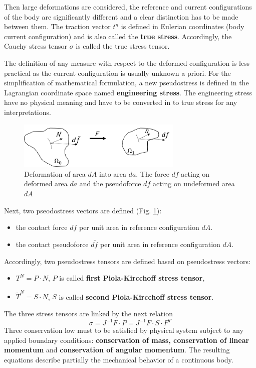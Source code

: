 Then large deformations are considered, the reference and current configurations of the body are significantly different and a clear distinction has to be made between them. The traction vector $t^n$ is defined in Eulerian coordinates (body current configuration) and is also called the \textbf{true stress}. Accordingly, the Cauchy stress tensor $\sigma$ is called the true stress tensor.

The definition of any measure with respect to the deformed configuration is less practical as the current configuration is usually unknown a priori. For the simplification of mathematical formulation, a new pseudostress is defined in the Lagrangian coordinate space named \textbf{engineering stress}. The engineering stress have no physical meaning and have to be converted in to true stress for any interpretations.


\begin{figure}
\begin{center}
\includegraphics[width=0.7\textwidth,keepaspectratio]{figures/stressnotion.png} 
\caption[]{Deformation of area $dA$  into area $da$. The force $df$ acting on deformed area $da$ and the pseudoforce $d\tilde{f}$ acting on undeformed area $dA$}
\label{stressnotion}
\end{center}
\end{figure} 


Next, two pseodostress vectors are defined (Fig. \ref{stressnotion}):
\begin{itemize}
\item the contact force $df$ per unit area in reference configuration  $dA$.
\item the contact pseudoforce $d\tilde{f}$ per unit area in reference configuration $dA$.  
\end{itemize}

Accordingly, two pseudostress tensors are defined based on pseudostress vectors:
\begin{itemize}
\item $T^N = P \cdot N$, $P$ is called \textbf{first Piola-Kircchoff stress tensor},
\item  $\tilde{T}^N = S \cdot N $, $S$ is called \textbf{second Piola-Kircchoff stress tensor}. 
\end{itemize} 
The three stress tensors are linked by the next relation 
\begin{equation}
\sigma = J^{-1}F \cdot P = J^{-1} F \cdot S \cdot F^T
\label{PK12}
\end{equation}
Three conservation low must to be satisfied by physical system subject to any applied boundary conditions: \textbf{conservation of mass, conservation of linear momentum} and \textbf{conservation of angular momentum}. The resulting equations describe partially the mechanical behavior of a continuous body.

